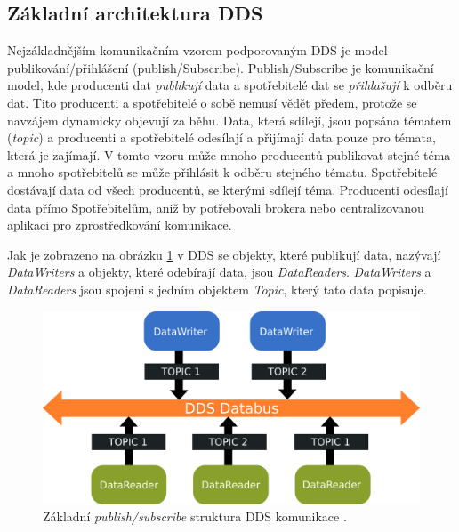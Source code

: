\subsection{Základní architektura \acs{DDS}}

Nejzákladnějším komunikačním vzorem podporovaným \acs{DDS} je model publikování/přihlášení (publish/Subscribe). Publish/Subscribe je komunikační model, kde producenti dat \textit{publikují} data a spotřebitelé dat se \textit{přihlašují} k odběru dat. Tito producenti a spotřebitelé o sobě nemusí vědět předem, protože se navzájem dynamicky objevují za běhu. Data, která sdílejí, jsou popsána tématem (\textit{topic}) a producenti a spotřebitelé odesílají a přijímají data pouze pro témata, která je zajímají. V tomto vzoru může mnoho producentů publikovat stejné téma a mnoho spotřebitelů se může přihlásit k odběru stejného tématu. Spotřebitelé dostávají data od všech producentů, se kterými sdílejí téma. Producenti odesílají data přímo Spotřebitelům, aniž by potřebovali brokera nebo centralizovanou aplikaci pro zprostředkování komunikace. \cite{DDS_PubSub}

Jak je zobrazeno na obrázku \ref{fig:DDSarch} v \acs{DDS} se objekty, které publikují data, nazývají \textit{DataWriters} a objekty, které odebírají data, jsou \textit{DataReaders}. \textit{DataWriters} a \textit{DataReaders} jsou spojeni s jedním objektem \textit{Topic}, který tato data popisuje.

\begin{figure}[!ht]
  \begin{center}
    \includegraphics[scale=0.35]{obrazky/DDS2}
  \end{center}
  \caption[Základní \textit{publish/subscribe} struktura \acs{DDS} komunikace]{Základní \textit{publish/subscribe} struktura \acs{DDS} komunikace \cite{DDS_PubSub}.}
  \label{fig:DDSarch}
\end{figure}

